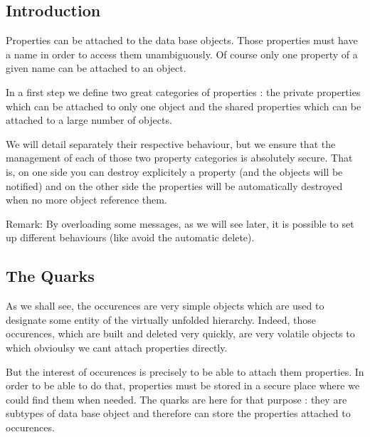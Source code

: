 \hypertarget{classHurricane_1_1Property_secPropertyIntro}{}\subsection{Introduction}\label{classHurricane_1_1Property_secPropertyIntro}
Properties can be attached to the data base objects. Those properties must have a name in order to access them unambiguously. Of course only one property of a given name can be attached to an object.

In a first step we define two great categories of properties \+: the private properties which can be attached to only one object and the shared properties which can be attached to a large number of objects.

We will detail separately their respective behaviour, but we ensure that the management of each of those two property categories is absolutely secure. That is, on one side you can destroy explicitely a property (and the objects will be notified) and on the other side the properties will be automatically destroyed when no more object reference them.

\begin{DoxyParagraph}{Remark\+:}
By overloading some messages, as we will see later, it is possible to set up different behaviours (like avoid the automatic delete).
\end{DoxyParagraph}
\hypertarget{classHurricane_1_1Property_secPropertyTheQuarks}{}\subsection{The Quarks}\label{classHurricane_1_1Property_secPropertyTheQuarks}
As we shall see, the occurences are very simple objects which are used to designate some entity of the virtually unfolded hierarchy. Indeed, those occurences, which are built and deleted very quickly, are very volatile objects to which obvioulsy we can\textquotesingle{}t attach properties directly.

But the interest of occurences is precisely to be able to attach them properties. In order to be able to do that, properties must be stored in a secure place where we could find them when needed. The quarks are here for that purpose \+: they are subtypes of data base object and therefore can store the properties attached to occurences.

